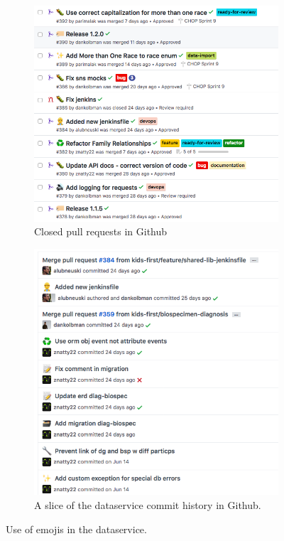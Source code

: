 \documentclass[a4paper,12pt,titlepage]{scrartcl}
\begin{document}
	\begin{figure}
	\centering
   	\begin{subfigure}[h]{0.4\textwidth}
    		\centering
    		\includegraphics[width=\textwidth]{images/prhistory.png}
    		\caption{Closed pull requests in Github}
    		\label{fig:prhistory}
    	\end{subfigure}
    	 \hfill
  	\begin{subfigure}[h]{0.4\textwidth}
    		\centering
    		\includegraphics[width=\textwidth]{images/commithistory.png}
    		\caption{A slice of the dataservice commit history in Github.}
    		\label{fig:commithistory}
    	\end{subfigure}
    	\caption{Use of emojis in the dataservice.}
   	\end{figure}	
	
\end{document}
